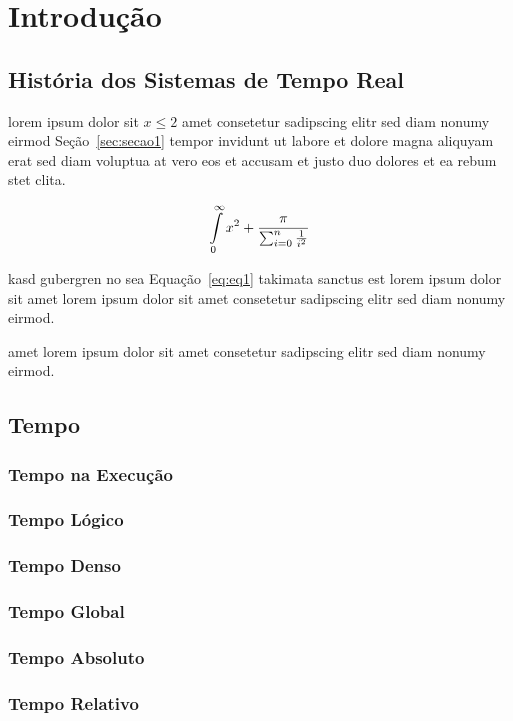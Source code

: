 \chapter{\label{chap:intro}Introdução }

\section{\label{sec:secao1}História dos Sistemas de Tempo Real}
lorem ipsum dolor sit $x\leq 2$  amet consetetur sadipscing elitr
sed diam nonumy eirmod Seção~\ref{sec:secao1} tempor invidunt ut
labore et dolore magna aliquyam erat sed diam voluptua at vero eos
et accusam et justo duo dolores et ea rebum stet
clita.~\cite{OLIVEIRAAPL08}

\begin{equation}\label{eq:eq1}
	\intop_{0}^{\infty}{x^2 + \frac{\pi}{\sum_{i=0}^{n}{\frac{1}{i^2}}}}
\end{equation}

kasd gubergren no sea Equação~\eqref{eq:eq1} takimata sanctus est
lorem ipsum dolor sit amet lorem ipsum dolor sit amet consetetur
sadipscing elitr sed diam nonumy eirmod.~\cite{PICCOLIAPL11}

amet lorem ipsum dolor sit amet consetetur sadipscing elitr sed
diam nonumy eirmod.~\cite{PICCOLIDM08}

\section{\label{sec:secao2}Tempo}
\subsection{Tempo na Execução}
\subsection{Tempo Lógico}
\subsection{Tempo Denso}
\subsection{Tempo Global}
\subsection{Tempo Absoluto}
\subsection{Tempo Relativo}


